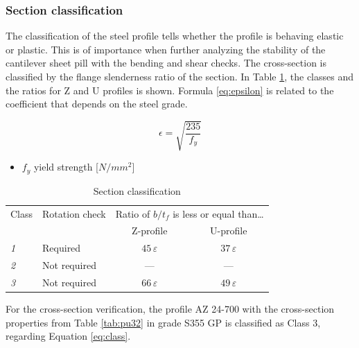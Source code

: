
\subsubsection{Section classification}

The classification of the steel profile tells whether the profile is behaving elastic or plastic. This is of importance when further analyzing the stability of the cantilever sheet pill with the bending and shear checks. The cross-section is classified by the flange slenderness ratio of the section. In Table \ref{tab:section_classification}, the classes and the ratios for Z and U profiles is shown. Formula \ref{eq:epsilon} is related to the coefficient that depends on the steel grade. 

\begin{equation}
    \epsilon = \sqrt{\frac{235}{f_{y}}}
    \label{eq:epsilon}
\end{equation}

\begin{itemize}
    \item $f_{y}$   yield strength [$N/mm^{2}$]
\end{itemize}

\begin{table}[H]
  \centering
  \small
  \setlength{\tabcolsep}{8pt}
  \renewcommand{\arraystretch}{1.15}
  \caption{Section classification}
  \label{tab:section_classification}
  \begin{tabular}{@{}l l c c@{}}
    \toprule
    \multicolumn{1}{l}{Class} &
    \multicolumn{1}{l}{Rotation check} &
    \multicolumn{2}{c}{Ratio of $b/t_f$ is less or equal than\ldots} \\
    \cmidrule(lr){3-4}
    & & Z-profile & U-profile \\
    \midrule
    \textit{1} & Required     & $45\,\varepsilon$ & $37\,\varepsilon$ \\
    \textit{2} & Not required & ---               & ---               \\
    \textit{3} & Not required & $66\,\varepsilon$ & $49\,\varepsilon$ \\
    \bottomrule
  \end{tabular}
\end{table}

For the cross-section verification, the profile AZ 24-700 with the cross-section properties from Table \ref{tab:pu32} in grade S355 GP is classified as Class 3, regarding Equation \ref{eq:class}.

